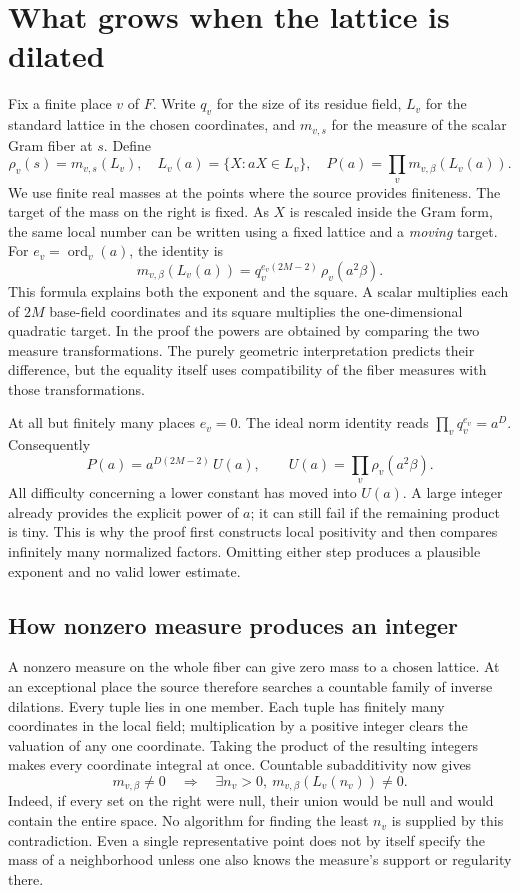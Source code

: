 \documentclass[12pt,letterpaper]{article}
\begin{document}
\clearpage\section{What grows when the lattice is dilated}
Fix a finite place \(v\) of \(F\). Write \(q_v\) for the size of its residue field, \(L_v\) for the standard lattice in the chosen coordinates, and \(m_{v,s}\) for the measure of the scalar Gram fiber at \(s\). Define
\[
 \rho_v(s)=m_{v,s}(L_v),\quad
 L_v(a)=\{X:aX\in L_v\},\quad
 P(a)=\prod_v m_{v,\beta}(L_v(a)).
\]
We use finite real masses at the points where the source provides finiteness. The target of the mass on the right is fixed. As \(X\) is rescaled inside the Gram form, the same local number can be written using a fixed lattice and a \emph{moving} target. For \(e_v=\operatorname{ord}_v(a)\), the identity is
\[
 m_{v,\beta}(L_v(a))=q_v^{e_v(2M-2)}\,\rho_v(a^2\beta).
\]
This formula explains both the exponent and the square. A scalar multiplies each of \(2M\) base-field coordinates and its square multiplies the one-dimensional quadratic target. In the proof the powers are obtained by comparing the two measure transformations. The purely geometric interpretation predicts their difference, but the equality itself uses compatibility of the fiber measures with those transformations.

At all but finitely many places \(e_v=0\). The ideal norm identity reads
\(\prod_v q_v^{e_v}=a^D\). Consequently
\[
              P(a)=a^{D(2M-2)}\,U(a),\qquad
                  U(a)=\prod_v\rho_v(a^2\beta).
\]
All difficulty concerning a lower constant has moved into \(U(a)\). A large integer already provides the explicit power of \(a\); it can still fail if the remaining product is tiny. This is why the proof first constructs local positivity and then compares infinitely many normalized factors. Omitting either step produces a plausible exponent and no valid lower estimate.

\clearpage\subsection{How nonzero measure produces an integer}
A nonzero measure on the whole fiber can give zero mass to a chosen lattice. At an exceptional place the source therefore searches a countable family of inverse dilations. Every tuple lies in one member. Each tuple has finitely many coordinates in the local field; multiplication by a positive integer clears the valuation of any one coordinate. Taking the product of the resulting integers makes every coordinate integral at once. Countable subadditivity now gives
\[
  m_{v,\beta}\ne0\quad\Longrightarrow\quad
  \exists n_v>0,\ m_{v,\beta}(L_v(n_v))\ne0 .
\]
Indeed, if every set on the right were null, their union would be null and would contain the entire space. No algorithm for finding the least \(n_v\) is supplied by this contradiction. Even a single representative point does not by itself specify the mass of a neighborhood unless one also knows the measure's support or regularity there.
\end{document}
